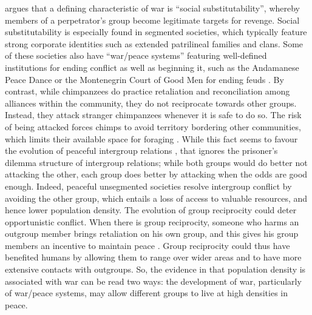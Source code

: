 \documentclass[12pt,a4paper]{article}\usepackage[]{graphicx}\usepackage[]{color}
\begin{document}
\citet{kelly2000warless} argues that a defining characteristic of war is ``social substitutability'', whereby members
of a perpetrator's group become legitimate targets for revenge. Social substitutability is especially found in segmented
societies, which typically feature strong corporate identities such as extended patrilineal families and clans.
Some of these societies also have ``war/peace systems'' featuring well-defined institutions for ending conflict as well as beginning it, such as the Andamanese Peace Dance or the Montenegrin Court of Good Men for ending feuds
\citep{boehm1984blood}. By
contrast, while chimpanzees do practice retaliation and reconciliation among alliances within the community, they  do not
reciprocate towards other groups. Instead, they attack stranger chimpanzees whenever it is safe to do so. The risk of
being attacked forces chimps to avoid territory bordering other communities, which limits their available space for foraging
\citep{wilson2003intergroup}. While this fact seems to favour the evolution of peaceful intergroup relations
\citep{kelly2005evolution}, that ignores the prisoner's dilemma structure of intergroup relations; while both groups would
do better not attacking the other, each group does better by attacking when the odds are good enough. Indeed, peaceful
unsegmented societies resolve intergroup conflict by avoiding the other group, which entails a loss of access to valuable
resources, and hence lower population density. The evolution of group
reciprocity could deter opportunistic conflict. When there is group reciprocity, someone who harms an outgroup member
brings retaliation on his own group, and this gives his group members an incentive to maintain peace
\citep{boehm1984blood}. Group reciprocity could thus have benefited humans by allowing them to range over wider
areas and to have more extensive contacts with outgroups.  So, the evidence in \citet{kelly2000warless} that population
density is associated with war can be read two ways: the development of war, particularly of war/peace systems, may
allow different groups to live at high densities in peace.
\end{document}
